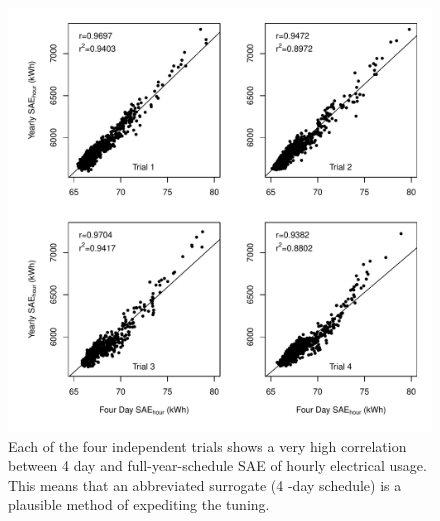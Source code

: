\documentclass[preprint, review, 12pt]{elsarticle}
\begin{document}
\begin{figure}[htbp]
\centering
\includegraphics[width=5in]{figure1}
\caption{Each of the four independent trials shows a very high correlation between 4 day and full-year-schedule SAE of hourly electrical usage. This means that an abbreviated surrogate (4 -day schedule) is a plausible method of expediting the tuning.}
\label{fig:hour-corr}
\end{figure}
\end{document}
